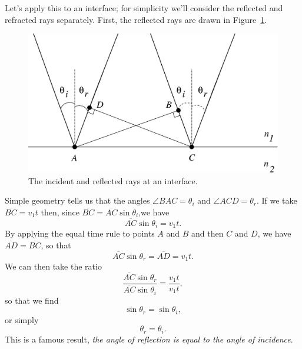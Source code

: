 Let's apply this to an interface; for simplicity we'll consider the reflected
and refracted rays separately.  First, the reflected rays are drawn in 
Figure~\ref{fig:opt:reflected}.
\begin{figure}[htb]
\centering 
\epsfxsize=10cm \includegraphics[scale=0.6]{8_optics/reflected.eps}
\caption{The incident and reflected rays at an interface.}
\label{fig:opt:reflected}
\end{figure}
Simple geometry tells us that the angles $\angle BAC =\theta_i$ and 
$\angle ACD =\theta_r$. If we take $\overline{BC}=v_1 t$ then, since 
$\overline{BC}=\overline{AC}\sin\theta_i$,we have
$$ \overline{AC}\sin\theta_i = v_1 t. $$ 
By applying the equal time rule to points $A$ and $B$ and then $C$ and $D$, we
have $\overline{AD}=\overline{BC}$, so that 
$$ \overline{AC}\sin\theta_r = \overline{AD} = v_1 t. $$ 
We can then take the ratio
$$ \frac{\overline{AC}\sin\theta_r}{\overline{AC}\sin\theta_i} 
=\frac{v_1 t}{v_1 t}, $$
so that we find
$$ \sin\theta_r=\sin\theta_i, $$
or simply
$$ \theta_r=\theta_i. $$
This is a famous result, {\it the angle of reflection is equal to the angle of
incidence}.

